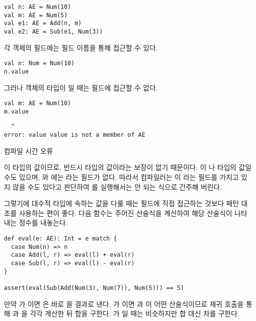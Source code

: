 \begin{verbatim}
val n: AE = Num(10)
val m: AE = Num(5)
val e1: AE = Add(n, m)
val e2: AE = Sub(e1, Num(3))
\end{verbatim}

각 객체의 필드에는 필드 이름을 통해 접근할 수 있다.

\begin{verbatim}
val n: Num = Num(10)
n.value
\end{verbatim}

그러나 객체의 타입이 일 때는 필드에 접근할 수 없다.

\begin{verbatim}
val m: AE = Num(10)
m.value
\end{verbatim}
\vspace{-1em}
\begin{mdframed}[hidealllines=true,backgroundcolor=gray!10,innerleftmargin=3pt,innerrightmargin=3pt,leftmargin=-3pt,rightmargin=-3pt]
\begin{verbatim}
  ^
error: value value is not a member of AE
\end{verbatim}
\vspace{-2em}
\begin{flushright}
\scriptsize\textsf{컴파일 시간 오류}
\end{flushright}
\end{mdframed}

이  타입의 값이므로, 반드시  타입의 값이라는 보장이
없기 때문이다. 이 나  타입의 값일 수도 있으며,
와 에는 라는 필드가 없다. 따라서 컴파일러는
이 라는 필드를 가지고 있지 않을 수도 있다고 판단하여
를 실행해서는 안 되는 식으로 간주해 버린다.

그렇기에 대수적 타입에 속하는 값을 다룰 때는 필드에 직접 접근하는 것보다 패턴
대조를 사용하는 편이 좋다. 다음 함수는 주어진 산술식을 계산하여 해당 산술식이
나타내는 정수를 내놓는다.

\begin{verbatim}
def eval(e: AE): Int = e match {
  case Num(n) => n
  case Add(l, r) => eval(l) + eval(r)
  case Sub(l, r) => eval(l) - eval(r)
}

assert(eval(Sub(Add(Num(3), Num(7)), Num(5))) == 5)
\end{verbatim}

만약 가 이면 은 바로 을 결과로 낸다.
가 이면 과 이 어떤 산술식이므로 재귀
호출을 통해 과 을 각각 계산한 뒤 합을 구한다. 가
일 때는 비슷하지만 합 대신 차를 구한다.

